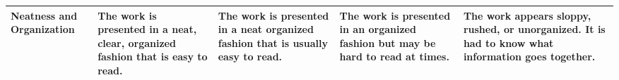 \documentclass[11pt]{article}
\begin{document}
\begin{table}[]
\begin{tabular}{|p{1.5cm}|p{4cm}|p{4cm}|p{4cm}|p{2.5cm}|}
Neatness and Organization & The work is presented in a neat, clear, organized fashion that is easy to read.                                                                                                                                             & The work is presented in a neat organized fashion that is usually easy to read.                                                                                                                                                  & The work is presented in an organized fashion but may be hard to read at times.                                                                                               & The work appears sloppy, rushed, or unorganized.  It is had to know what information goes together.    \\ \hline
\end{tabular}
\end{table}
\end{document}
